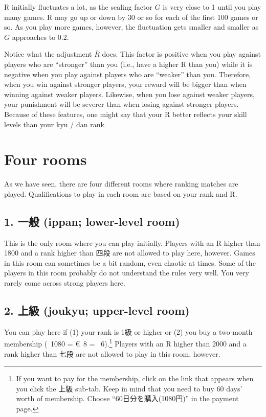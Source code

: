 \bigskip
R initially fluctuates a lot, as the scaling factor $G$ is very close to 1 until you play many games. R may go up or down by 30 or so for each of the first 100 games or so. As you play more games, however, the fluctuation gets smaller and smaller as $G$ approaches to $0.2$. 

\bigskip
Notice what the adjustment $\bar{R}$ does. This factor is positive when you play against players who are ``stronger'' than you (i.e., have a higher R than you) while it is negative when you play against players who are ``weaker'' than you. Therefore, when you win against stronger players, your reward will be bigger than when winning against weaker players. Likewise, when you lose against weaker players, your punishment will be severer than when losing against stronger players. 
Because of these features, one might say that your R better reflects your skill levels than your {\jap kyu / dan} rank. 

\section{Four rooms}
As we have seen, there are four different rooms where ranking matches are played. Qualifications to play in each room are based on your rank and R. 

\subsection*{1. 一般 ({\jap ippan}; lower-level room)}
This is the only room where you can play initially. Players with an R higher than 1800 and a rank higher than 四段 are not allowed to play here, however. Games in this room can sometimes be a bit random, even chaotic at times. Some of the players in this room probably do not understand the rules very well. You very rarely come across strong players here. 

\subsection*{2. 上級 ({\jap joukyu}; upper-level room)}
You can play here if (1) your rank is 1級 or higher or (2) you buy a two-month membership (\textyen~1080 = \euro~8 = \textsterling~6).\footnote{If you want to pay for the membership, click on the link that appears when you click the 上級 sub-tab. Keep in mind that you need to buy 60 days' worth of membership. Choose ``60日分を購入(1080円)'' in the payment page.} Players with an R higher than 2000 and a rank higher than 七段 are not allowed to play in this room, however. 

